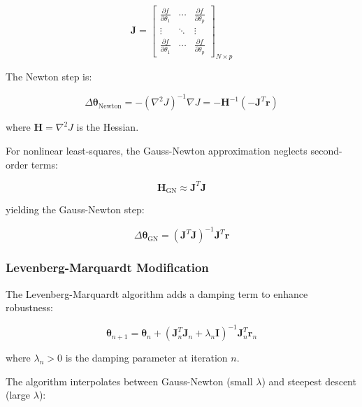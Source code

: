 \documentclass[12pt,a4paper]{article}
\newcommand{\deltatheta}{\Delta\boldsymbol{\theta}}
\begin{document}
\begin{equation}
\mathbf{J} = \begin{bmatrix}
\frac{\partial f}{\partial \theta_1} & \cdots & \frac{\partial f}{\partial \theta_p} \\
\vdots & \ddots & \vdots \\
\frac{\partial f}{\partial \theta_1} & \cdots & \frac{\partial f}{\partial \theta_p}
\end{bmatrix}_{N \times p}
\label{eq:jacobian}
\end{equation}

The Newton step is:

\begin{equation}
\deltatheta_{\text{Newton}} = -(\nabla^2 J)^{-1} \nabla J = -\mathbf{H}^{-1} \left( -\mathbf{J}^T \mathbf{r} \right)
\label{eq:newton_step}
\end{equation}

where $\mathbf{H} = \nabla^2 J$ is the Hessian.

For nonlinear least-squares, the Gauss-Newton approximation neglects second-order 
terms:

\begin{equation}
\mathbf{H}_{\text{GN}} \approx \mathbf{J}^T \mathbf{J}
\label{eq:hessian_approx}
\end{equation}

yielding the Gauss-Newton step:

\begin{equation}
\deltatheta_{\text{GN}} = (\mathbf{J}^T \mathbf{J})^{-1} \mathbf{J}^T \mathbf{r}
\label{eq:gauss_newton}
\end{equation}

\subsubsection{Levenberg-Marquardt Modification}

The Levenberg-Marquardt algorithm adds a damping term to enhance robustness:

\begin{equation}
\boldsymbol{\theta}_{n+1} = \boldsymbol{\theta}_n + (\mathbf{J}_n^T \mathbf{J}_n + \lambda_n \mathbf{I})^{-1} \mathbf{J}_n^T \mathbf{r}_n
\label{eq:lm_update}
\end{equation}

where $\lambda_n > 0$ is the damping parameter at iteration $n$.

The algorithm interpolates between Gauss-Newton (small $\lambda$) and steepest descent 
(large $\lambda$):
\end{document}
